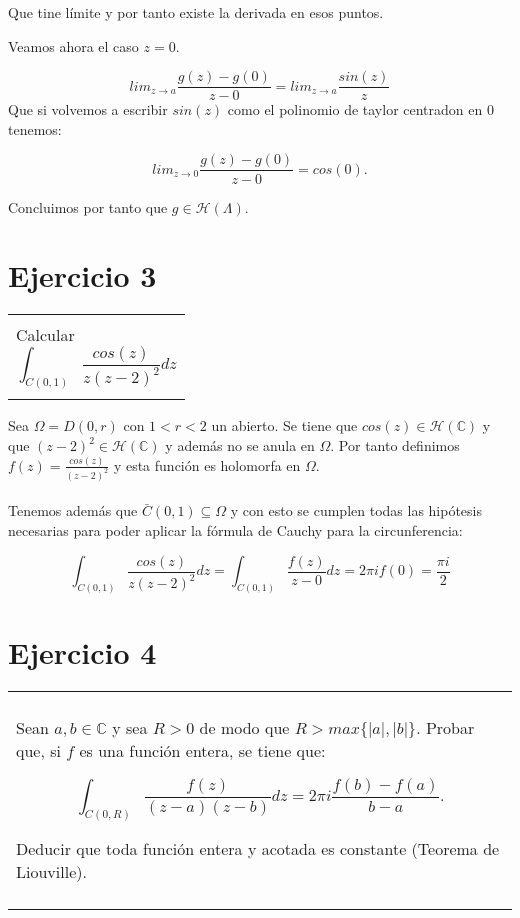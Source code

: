 \documentclass[12pt]{article}
\newenvironment{micaja}
{
    \begin{center}
    \begin{tabular}{|p{0.9\textwidth}|}
    \hline\\
    }   
    {   
    \\\\\hline
    \end{tabular} 
    \end{center}
    }
\begin{document}
Que tine límite y por tanto existe la derivada en esos puntos. 

Veamos ahora el caso $z=0$. 

$$lim_{z \longrightarrow a} \frac{g(z)-g(0)}{z-0} = lim_{z \longrightarrow a} \frac{sin(z)}{z}$$
Que si volvemos a escribir $sin(z)$ como el polinomio de taylor centradon en 0 tenemos:

$$lim_{z \longrightarrow 0} \frac{g(z)-g(0)}{z-0} = cos(0).$$ 

Concluimos por tanto que $g \in \mathcal H(\Lambda).$





\newpage
\section{Ejercicio 3}  
\begin{micaja}
    Calcular $$\int_{C(0,1)} \frac{cos(z)}{z(z-2)^2}dz$$
\end{micaja}

Sea $\Omega = D(0,r)$ con $1<r<2$ un abierto. Se tiene que $cos(z) \in \mathcal H(\mathbb C)$ 
y que $(z-2)^2 \in \mathcal H(\mathbb C)$  y además no se anula en $\Omega.$ 
Por tanto definimos $f(z) = \frac{cos(z)}{(z-2)^2}$ y esta función es holomorfa en
$\Omega.$ \paragraph{}

Tenemos además que $\bar{C}(0,1) \subseteq \Omega$ y con esto se cumplen todas las hipótesis
necesarias para poder aplicar la fórmula 
de Cauchy para la circunferencia:  

$$\int_{C(0,1)} \frac{cos(z)}{z(z-2)^2}dz = 
\int_{C(0,1)} \frac{f(z)}{z-0}dz = 2\pi i f(0) = \frac{\pi i}{2}$$

\newpage

\section{Ejercicio 4}

\begin{micaja}
    Sean $a,b  \in \mathbb C$ y sea $R >0$ de modo que $R>max\{|a|,|b|\}.$
    Probar que, si $f$ es una función entera, se tiene que:

    $$\int_{C(0,R)} \frac{f(z)}{(z-a)(z-b)}dz = 2\pi i \frac{f(b)-f(a)}{b-a}.$$
    
    Deducir que toda función entera y acotada es constante (Teorema de Liouville).
\end{micaja}
\end{document}
